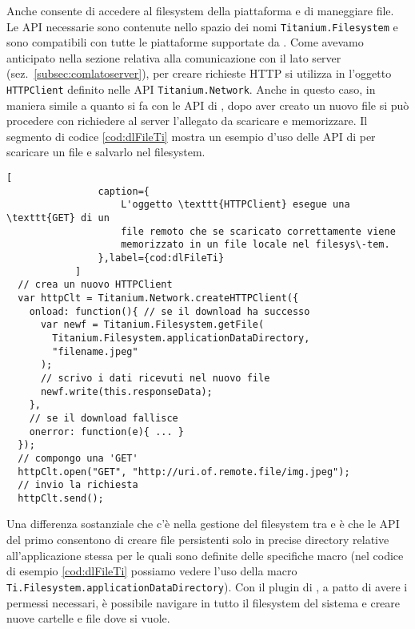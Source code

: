             Anche \tisdk{} consente di accedere al filesys\-tem della piattaforma
            e di maneggiare file. Le API necessarie sono contenute nello
            spazio dei nomi \texttt{Titanium.Filesystem} e sono compatibili
            con tutte le piattaforme supportate da \tisdk{}. Come avevamo
            anticipato nella sezione relativa alla comunicazione con il lato
            server (sez.~\ref{subsec:comlatoserver}), per creare richieste HTTP
            si utilizza in \tisdk{} l'oggetto \texttt{HTTPClient} definito nelle
            API \texttt{Titanium.Network}. Anche in questo caso, in maniera
            simile a quanto si fa con le API di \pg{}, dopo aver creato un nuovo
            file si può procedere con richiedere al server l'allegato da
            scaricare e memorizzare. Il segmento di codice \ref{cod:dlFileTi}
            mostra un esempio d'uso delle API di \tisdk{} per scaricare un file
            e salvarlo nel filesys\-tem.
            \begin{lstlisting}[
                caption={
                    L'oggetto \texttt{HTTPClient} esegue una \texttt{GET} di un
                    file remoto che se scaricato correttamente viene
                    memorizzato in un file locale nel filesys\-tem.
                },label={cod:dlFileTi}
            ]
  // crea un nuovo HTTPClient
  var httpClt = Titanium.Network.createHTTPClient({
    onload: function(){ // se il download ha successo
      var newf = Titanium.Filesystem.getFile(
        Titanium.Filesystem.applicationDataDirectory,
        "filename.jpeg"
      );
      // scrivo i dati ricevuti nel nuovo file
      newf.write(this.responseData);
    },
    // se il download fallisce
    onerror: function(e){ ... }
  });
  // compongo una 'GET'
  httpClt.open("GET", "http://uri.of.remote.file/img.jpeg");
  // invio la richiesta
  httpClt.send();
            \end{lstlisting}
            Una differenza sostanziale che c'è nella gestione del filesys\-tem
            tra \tisdk{} e \pg{} è che le API del primo consentono di creare
            file persistenti solo in precise directory relative
            all'applicazione stessa per le quali sono definite delle specifiche
            macro (nel codice di esempio \ref{cod:dlFileTi} possiamo vedere
            l'uso della macro \texttt{Ti.Filesystem.applicationDataDirectory}).
            Con il plugin di \pg{}, a patto di avere i permessi necessari, è
            possibile navigare in tutto il filesys\-tem del sistema e creare nuove
            cartelle e file dove si vuole.
